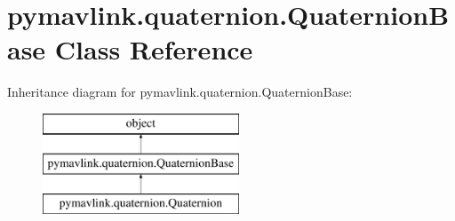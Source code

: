 \hypertarget{classpymavlink_1_1quaternion_1_1QuaternionBase}{}\section{pymavlink.\+quaternion.\+Quaternion\+Base Class Reference}
\label{classpymavlink_1_1quaternion_1_1QuaternionBase}
Inheritance diagram for pymavlink.\+quaternion.\+Quaternion\+Base\+:\begin{figure}[H]
\begin{center}
\leavevmode
\includegraphics[height=3.000000cm]{classpymavlink_1_1quaternion_1_1QuaternionBase}
\end{center}
\end{figure}
